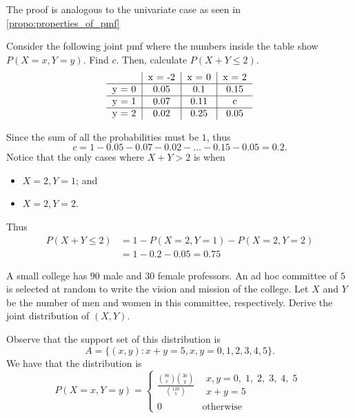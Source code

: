 \documentclass[notoc,notitlepage]{tufte-book}
\begin{document}
The proof is analogous to the univariate case as seen in \cref{propo:properties_of_pmf}

\begin{eg}[Example 3.2]\label{eg:eg_3_2}
  Consider the following joint pmf where the numbers inside the table show $P(X = x, Y = y)$. Find $c$. Then, calculate $P(X + Y \leq 2)$.
  \[
  \begin{tabular}{c | c | c | c}
          & x = -2 & x = 0 & x = 2 \\
    \hline
    y = 0 & 0.05   & 0.1   & 0.15 \\
    \hline
    y = 1 & 0.07   & 0.11  & c \\
    \hline
    y = 2 & 0.02   & 0.25  & 0.05 \\
  \end{tabular}
  \]

  \begin{solution}
    Since the sum of all the probabilities must be $1$, thus
    \begin{equation*}
      c = 1 - 0.05 - 0.07 - 0.02 - \hdots - 0.15 - 0.05 = 0.2.
    \end{equation*}
    Notice that the only cases where $X + Y > 2$ is when
    \begin{itemize}
      \item $X = 2, Y = 1$; and
      \item $X = 2, Y = 2$.
    \end{itemize}
    Thus
    \begin{align*}
      P(X + Y \leq 2) &= 1 - P(X = 2, Y = 1) - P(X = 2, Y = 2) \\
        &= 1 - 0.2 - 0.05 = 0.75
    \end{align*}
  \end{solution}
\end{eg}

\begin{eg}[Example 3.3]
  A small college has $90$ male and $30$ female professors. An ad hoc committee of $5$ is selected at random to write the vision and mission of the college. Let $X$ and $Y$ be the number of men and women in this committee, respectively. Derive the joint distribution of $(X, Y)$.

  \begin{solution}
    Observe that the support set of this distribution is
    \begin{equation*}
      A = \{(x, y) : x + y = 5, x, y = 0, 1, 2, 3, 4, 5 \}.
    \end{equation*}
    We have that the distribution is
    \begin{equation*}
      P(X = x, Y = y) = \begin{cases}
        \frac{\binom{90}{x} \binom{30}{y}}{\binom{120}{5}} & \substack{x, y = 0, \; 1, \; 2, \; 3, \; 4, \; 5 \\ x + y = 5} \\
        0             & \text{otherwise}
      \end{cases}
    \end{equation*}
  \end{solution}
\end{eg}
\end{document}
